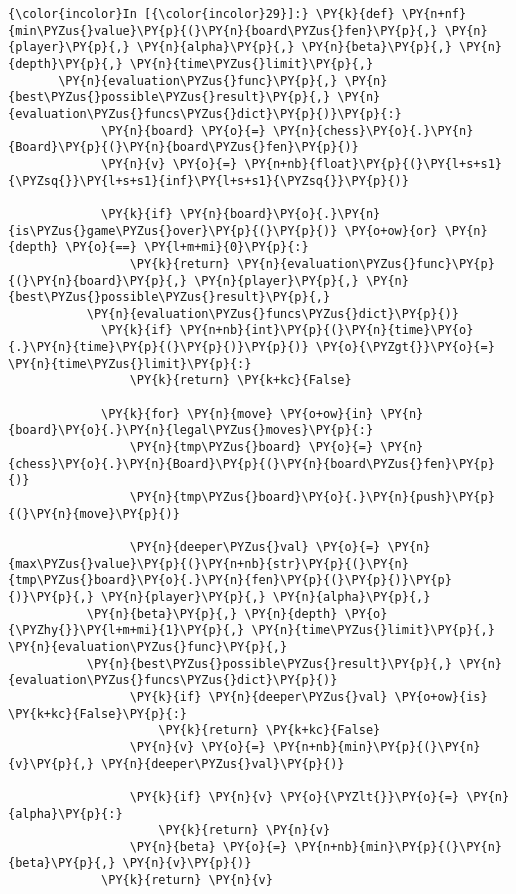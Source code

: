     \begin{Verbatim}[commandchars=\\\{\}]
{\color{incolor}In [{\color{incolor}29}]:} \PY{k}{def} \PY{n+nf}{min\PYZus{}value}\PY{p}{(}\PY{n}{board\PYZus{}fen}\PY{p}{,} \PY{n}{player}\PY{p}{,} \PY{n}{alpha}\PY{p}{,} \PY{n}{beta}\PY{p}{,} \PY{n}{depth}\PY{p}{,} \PY{n}{time\PYZus{}limit}\PY{p}{,} 
	   \PY{n}{evaluation\PYZus{}func}\PY{p}{,} \PY{n}{best\PYZus{}possible\PYZus{}result}\PY{p}{,} \PY{n}{evaluation\PYZus{}funcs\PYZus{}dict}\PY{p}{)}\PY{p}{:}
             \PY{n}{board} \PY{o}{=} \PY{n}{chess}\PY{o}{.}\PY{n}{Board}\PY{p}{(}\PY{n}{board\PYZus{}fen}\PY{p}{)}
             \PY{n}{v} \PY{o}{=} \PY{n+nb}{float}\PY{p}{(}\PY{l+s+s1}{\PYZsq{}}\PY{l+s+s1}{inf}\PY{l+s+s1}{\PYZsq{}}\PY{p}{)}
         
             \PY{k}{if} \PY{n}{board}\PY{o}{.}\PY{n}{is\PYZus{}game\PYZus{}over}\PY{p}{(}\PY{p}{)} \PY{o+ow}{or} \PY{n}{depth} \PY{o}{==} \PY{l+m+mi}{0}\PY{p}{:}
                 \PY{k}{return} \PY{n}{evaluation\PYZus{}func}\PY{p}{(}\PY{n}{board}\PY{p}{,} \PY{n}{player}\PY{p}{,} \PY{n}{best\PYZus{}possible\PYZus{}result}\PY{p}{,} 
		   \PY{n}{evaluation\PYZus{}funcs\PYZus{}dict}\PY{p}{)}
             \PY{k}{if} \PY{n+nb}{int}\PY{p}{(}\PY{n}{time}\PY{o}{.}\PY{n}{time}\PY{p}{(}\PY{p}{)}\PY{p}{)} \PY{o}{\PYZgt{}}\PY{o}{=} \PY{n}{time\PYZus{}limit}\PY{p}{:}
                 \PY{k}{return} \PY{k+kc}{False}
         
             \PY{k}{for} \PY{n}{move} \PY{o+ow}{in} \PY{n}{board}\PY{o}{.}\PY{n}{legal\PYZus{}moves}\PY{p}{:}
                 \PY{n}{tmp\PYZus{}board} \PY{o}{=} \PY{n}{chess}\PY{o}{.}\PY{n}{Board}\PY{p}{(}\PY{n}{board\PYZus{}fen}\PY{p}{)}
                 \PY{n}{tmp\PYZus{}board}\PY{o}{.}\PY{n}{push}\PY{p}{(}\PY{n}{move}\PY{p}{)}
         
                 \PY{n}{deeper\PYZus{}val} \PY{o}{=} \PY{n}{max\PYZus{}value}\PY{p}{(}\PY{n+nb}{str}\PY{p}{(}\PY{n}{tmp\PYZus{}board}\PY{o}{.}\PY{n}{fen}\PY{p}{(}\PY{p}{)}\PY{p}{)}\PY{p}{,} \PY{n}{player}\PY{p}{,} \PY{n}{alpha}\PY{p}{,} 
		   \PY{n}{beta}\PY{p}{,} \PY{n}{depth} \PY{o}{\PYZhy{}}\PY{l+m+mi}{1}\PY{p}{,} \PY{n}{time\PYZus{}limit}\PY{p}{,} \PY{n}{evaluation\PYZus{}func}\PY{p}{,} 
		   \PY{n}{best\PYZus{}possible\PYZus{}result}\PY{p}{,} \PY{n}{evaluation\PYZus{}funcs\PYZus{}dict}\PY{p}{)}
                 \PY{k}{if} \PY{n}{deeper\PYZus{}val} \PY{o+ow}{is} \PY{k+kc}{False}\PY{p}{:}
                     \PY{k}{return} \PY{k+kc}{False}            
                 \PY{n}{v} \PY{o}{=} \PY{n+nb}{min}\PY{p}{(}\PY{n}{v}\PY{p}{,} \PY{n}{deeper\PYZus{}val}\PY{p}{)}  
         
                 \PY{k}{if} \PY{n}{v} \PY{o}{\PYZlt{}}\PY{o}{=} \PY{n}{alpha}\PY{p}{:}
                     \PY{k}{return} \PY{n}{v}
                 \PY{n}{beta} \PY{o}{=} \PY{n+nb}{min}\PY{p}{(}\PY{n}{beta}\PY{p}{,} \PY{n}{v}\PY{p}{)}
             \PY{k}{return} \PY{n}{v}
\end{Verbatim}

